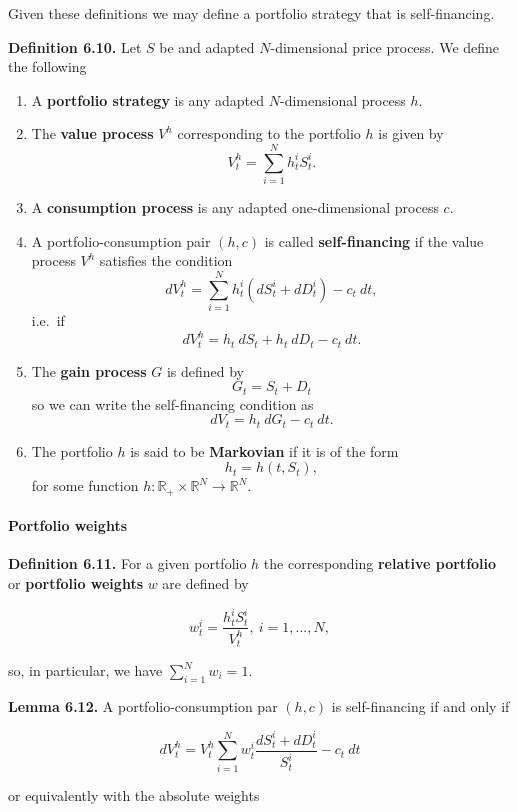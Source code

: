 \documentclass[
]{article}
\providecommand{\tightlist}{%
  \setlength{\itemsep}{0pt}\setlength{\parskip}{0pt}}
\begin{document}
Given these definitions we may define a portfolio strategy that is
self-financing.

\textbf{Definition 6.10.} Let \(S\) be and adapted \(N\)-dimensional
price process. We define the following

\begin{enumerate}
\def\labelenumi{\arabic{enumi}.}
\tightlist
\item
  A \textbf{portfolio strategy} is any adapted \(N\)-dimensional process
  \(h\).
\item
  The \textbf{value process} \(V^h\) corresponding to the portfolio
  \(h\) is given by \[
    V_t^h=\sum_{i=1}^N h_t^iS_t^i.
    \]
\item
  A \textbf{consumption process} is any adapted one-dimensional process
  \(c\).
\item
  A portfolio-consumption pair \((h,c)\) is called
  \textbf{self-financing} if the value process \(V^h\) satisfies the
  condition \[
    dV_t^h=\sum_{i=1}^N h_t^i(dS_t^i+d D^i_t)-c_t\ dt,
    \] i.e.~if \[
    dV_t^h=h_t\ dS_t + h_t\ dD_t -c_t\ dt.
    \]
\item
  The \textbf{gain process} \(G\) is defined by \[
    G_t=S_t+D_t
    \] so we can write the self-financing condition as \[
    dV_t=h_t\ dG_t-c_t\ dt.
    \]
\item
  The portfolio \(h\) is said to be \textbf{Markovian} if it is of the
  form \[
    h_t=h(t,S_t),
    \] for some function
  \(h : \mathbb{R}_+\times \mathbb{R}^N\to\mathbb{R}^N\).
\end{enumerate}

\hypertarget{portfolio-weights}{%
\paragraph{Portfolio weights}\label{portfolio-weights}}

\textbf{Definition 6.11.} For a given portfolio \(h\) the corresponding
\textbf{relative portfolio} or \textbf{portfolio weights} \(w\) are
defined by

\[
w_t^i=\frac{h_t^iS_t^i}{V_t^h},\ i=1,...,N,
\]

so, in particular, we have \(\sum_{i=1}^N w_i=1\).

\textbf{Lemma 6.12.} A portfolio-consumption par \((h,c)\) is
self-financing if and only if

\[
dV_t^h=V_t^h\sum_{i=1}^N w_t^i\frac{dS_t^i+dD_t^i}{S_t^i}-c_t\ dt
\]

or equivalently with the absolute weights
\end{document}
